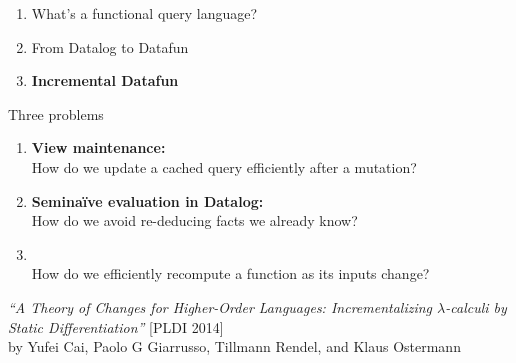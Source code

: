 \documentclass[xcolor=table,usenames,dvipsnames,svgnames]{beamer}
\begin{document}

\begin{frame}\Large
  \begin{enumerate}\color{gray}\itemsep 1.5em
  \item What's a functional query language?
  \item From Datalog to Datafun
  \item {\color{black}\bf Incremental Datafun}
  \end{enumerate}
\end{frame}


\begin{frame}{Three problems}\large
  \begin{enumerate}\itemsep 1em
  \item {\bf View maintenance:} \\
    {\normalsize How do we update a cached query efficiently after a mutation?}\
    \pause
  \item {\bf Semina\"ive evaluation in Datalog:}\\
    {\normalsize How do we avoid re-deducing facts we already know?}
    \pause
  \item \color{black}{\bf Incremental computation:}\\
    {\normalsize How do we efficiently recompute a function as its
      inputs change?}
  \end{enumerate}
\end{frame}

\begin{frame}
  \Large {\itshape ``A Theory of Changes for Higher-Order Languages:
    Incrementalizing $\lambda$-calculi by Static Differentiation''}%
  \vspace{0.1em}\newline\normalsize [PLDI 2014]
  \\\vspace{0.5em}
  \small by Yufei Cai, Paolo G Giarrusso, Tillmann Rendel, and Klaus Ostermann
\end{frame}
\end{document}

